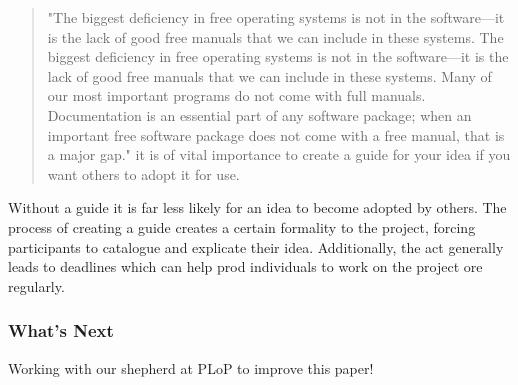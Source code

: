\begin{quote}
"The biggest deficiency in free operating systems is not in the software—it is the lack of good free manuals that we can include in these systems. The biggest deficiency in free operating systems is not in the software—it is the lack of good free manuals that we can include in these systems. Many of our most important programs do not come with full manuals. Documentation is an essential part of any software package; when an important free software package does not come with a free manual, that is a major gap." it is of vital importance to create a guide for your idea if you want others to adopt it for use.
\end{quote}

Without a guide it is far less likely for an idea to become adopted by others. The process of creating a guide creates a certain formality to the project, forcing participants to catalogue and explicate their idea. Additionally, the act generally leads to deadlines which can help prod individuals to work on the project ore regularly.

\subsubsection*{What's Next} 
Working with our shepherd at PLoP to improve this paper!


